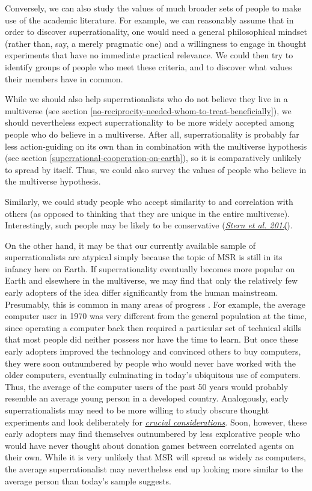 Conversely, we can also study the values of much broader sets of people
to make use of the academic literature. For example, we can reasonably
assume that in order to discover superrationality, one would need a
general philosophical mindset (rather than, say, a merely pragmatic one)
and a willingness to engage in thought experiments that have no
immediate practical relevance. We could then try to identify groups of
people who meet these criteria, and to discover what values their
members have in common.

While we should also help superrationalists who do not believe they live
in a multiverse (see section
\ref{no-reciprocity-needed-whom-to-treat-beneficially}), we should nevertheless expect superrationality to be
more widely accepted among people who do believe in a multiverse. After
all, superrationality is probably far less action-guiding on its own
than in combination with the multiverse hypothesis (see section
\ref{superrational-cooperation-on-earth}), so it is comparatively unlikely to spread by
itself. Thus, we could also survey the values of people who believe in
the multiverse hypothesis.

Similarly, we could study people who accept similarity to and
correlation with others (as opposed to thinking that they are unique in
the entire multiverse). Interestingly, such people may be likely to be
conservative
(\href{http://journals.sagepub.com/doi/pdf/10.1177/0956797613500796}{\emph{Stern
et al. 2014}}).

On the other hand, it may be that our currently available sample of
superrationalists are atypical simply because the topic of MSR is still
in its infancy here on Earth. If superrationality eventually becomes
more popular on Earth and elsewhere in the multiverse, we may find that
only the relatively few early adopters of the idea differ significantly
from the human mainstream. Presumably, this is common in many areas of
progress \parencite{Rogers2010-hg}. For example, the average
computer user in 1970 was very different from the general population at
the time, since operating a computer back then required a particular set
of technical skills that most people did neither possess nor have the
time to learn. But once these early adopters improved the technology and
convinced others to buy computers, they were soon outnumbered by people
who would never have worked with the older computers, eventually
culminating in today's ubiquitous use of computers. Thus, the average of
the computer users of the past 50 years would probably resemble an
average young person in a developed country. Analogously, early
superrationalists may need to be more willing to study obscure thought
experiments and look deliberately for
\href{https://concepts.effectivealtruism.org/concepts/the-importance-of-crucial-considerations/}{\emph{crucial
considerations}}. Soon, however, these early adopters may find
themselves outnumbered by less explorative people who would have never
thought about donation games between correlated agents on their own.
While it is very unlikely that MSR will spread as widely as computers,
the average superrationalist may nevertheless end up looking more
similar to the average person than today's sample suggests.


